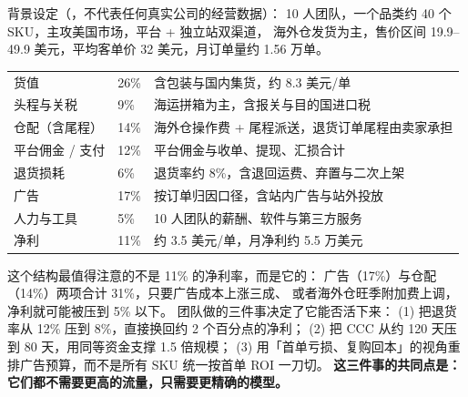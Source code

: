 \begin{casebox}
背景设定（，不代表任何真实公司的经营数据）：
10 人团队，一个品类约 40 个 SKU，主攻美国市场，平台 + 独立站双渠道，
海外仓发货为主，售价区间 19.9--49.9 美元，平均客单价 32 美元，月订单量约 1.56 万单。

\begin{center}
\small
\begin{tabularx}{\linewidth}{L{2.1cm} L{1.7cm} Y}
\toprule
{} &  &  \\
\midrule
货值 & 26\% & 含包装与国内集货，约 8.3 美元/单 \\
\addlinespace
头程与关税 & 9\% & 海运拼箱为主，含报关与目的国进口税 \\
\addlinespace
仓配（含尾程） & 14\% & 海外仓操作费 + 尾程派送，退货订单尾程由卖家承担 \\
\addlinespace
平台佣金 / 支付 & 12\% & 平台佣金与收单、提现、汇损合计 \\
\addlinespace
退货损耗 & 6\% & 退货率约 8\%，含退回运费、弃置与二次上架 \\
\addlinespace
广告 & 17\% & 按订单归因口径，含站内广告与站外投放 \\
\addlinespace
人力与工具 & 5\% & 10 人团队的薪酬、软件与第三方服务 \\
\addlinespace
净利 & 11\% & 约 3.5 美元/单，月净利约 5.5 万美元 \\
\bottomrule
\end{tabularx}
\label{tab:cbec-casestructure}
\end{center}

这个结构最值得注意的不是 11\% 的净利率，而是它的：
广告（17\%）与仓配（14\%）两项合计 31\%，只要广告成本上涨三成、
或者海外仓旺季附加费上调，净利就可能被压到 5\% 以下。
团队做的三件事决定了它能否活下来：
(1) 把退货率从 12\% 压到 8\%，直接换回约 2 个百分点的净利；
(2) 把 CCC 从约 120 天压到 80 天，用同等资金支撑 1.5 倍规模；
(3) 用「首单亏损、复购回本」的视角重排广告预算，而不是所有 SKU 统一按首单 ROI 一刀切。
\textbf{这三件事的共同点是：它们都不需要更高的流量，只需要更精确的模型。}
\end{casebox}

